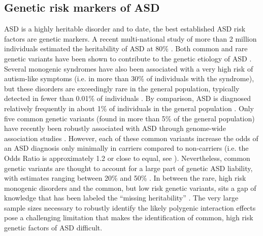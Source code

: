 \documentclass[9pt,lineno]{elife}
\begin{document}
\subsection{Genetic risk markers of ASD}
ASD is a highly heritable disorder and to date, the best established ASD risk factors are genetic markers. A recent multi-national study of more than 2 million individuals estimated the heritability of ASD at 80\% \citep{Bai2019-hb}. Both common \citep[e.g. Single-nucleotide polymorphism, SNP, ][]{Grove2019-vz} and rare genetic variants \citep[e.g. recurrent Copy-number variant, CNV, ][]{Sanders2019-wi} have been shown to contribute to the genetic etiology of ASD \citep{Geschwind2015-ss}. Several monogenic syndromes have also been associated with a very high risk of autism-like symptoms (i.e. in more than 30\% of individuals with the syndrome), but these disorders are exceedingly rare in the general population, typically detected in fewer than 0.01\% of individuals \citep{De_la_Torre-Ubieta2016-fw}. By comparison, ASD is diagnosed relatively frequently in about 1\% of individuals in the general population \citep{Bai2019-hb}. Only five common genetic variants (found in more than 5\% of the general population) have recently been robustly associated with ASD through genome-wide association studies \citep{Grove2019-vz}. However, each of these common variants increase the odds of an ASD diagnosis only minimally in carriers compared to non-carriers (i.e. the Odds Ratio is approximately 1.2 or close to equal, see ). Nevertheless, common genetic variants are thought to account for a large part of genetic ASD liability, with estimates ranging between 20\% \citep{Robinson2016-dd} and 50\% \citep{Gaugler2014-vi}. In between the rare, high risk monogenic disorders and the common, but low risk genetic variants, sits a gap of knowledge that has been labeled the “missing heritability” \citep{Manolio2009-sr,Maher2008-dz}. The very large sample sizes necessary \citep{Khera2018-of} to robustly identify the likely polygenic interaction effects \citep{OConnor2019-wp} pose a challenging limitation that makes the identification of common, high risk genetic factors of ASD difficult.
\end{document}

